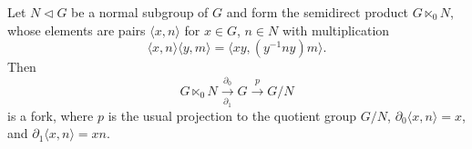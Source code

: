 Let $N \triangleleft G$ be a normal subgroup of $G$ and form the semidirect product $G \ltimes_0 N$, whose elements are pairs $\langle x, n \rangle$ for $x \in G$, $n \in N$ with multiplication
$$\langle x, n \rangle \langle y, m \rangle = \langle xy, (y^{-1}ny)m \rangle.$$
Then
$$G \ltimes_0 N \xrightarrow[\partial_1]{\partial_0} G \xrightarrow{p} G/N$$
is a fork, where $p$ is the usual projection to the quotient group $G/N$, $\partial_0\langle x, n\rangle = x$, and $\partial_1\langle x, n\rangle = xn$.
